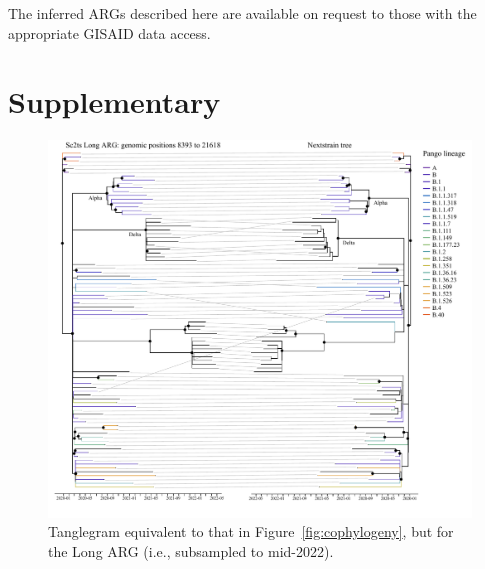 \documentclass{article}
\begin{document}
The inferred ARGs described here are available on request to those with
the appropriate GISAID data access.




\clearpage
\renewcommand\thefigure{S\arabic{figure}}
\setcounter{figure}{0}
\renewcommand\thetable{S\arabic{table}}
\setcounter{table}{0}
\section*{Supplementary}

\begin{figure}[h] \centering
\includegraphics[width=\textwidth]{figures/supp_cophylogeny_long.pdf}
\caption{\label{fig:cophylogeny_long}Tanglegram equivalent to that in Figure~\ref{fig:cophylogeny},
but for the Long ARG (i.e., subsampled to mid-2022).}
\end{figure}
\end{document}
